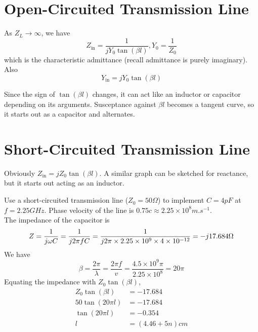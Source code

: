 \documentclass[12pt]{article}
\begin{document}
\section{Open-Circuited Transmission Line}

As $Z_L \rightarrow \infty$, we have
$$Z_{\text{in}} = \frac{1}{jY_0\tan(\beta l)}, Y_0 = \frac{1}{Z_0}$$
which is the characteristic admittance (recall admittance is purely imaginary). Also
$$Y_{\text{in}} = jY_0\tan(\beta l)$$

Since the sign of $\tan(\beta l)$ changes, it can act like an inductor or capacitor depending on its arguments. Susceptance against $\beta l$ becomes a tangent curve, so it starts out as a capacitor and alternates.

\section{Short-Circuited Transmission Line}

Obviously $Z_{\text{in}} = jZ_0\tan(\beta l)$. A similar graph can be sketched for reactance, but it starts out acting as an inductor.

\begin{ex}
    Use a short-circuited transmission line ($Z_0 = 50\unit{\Omega}$) to implement $C = 4\unit{pF}$ at $f = 2.25\unit{GHz}$. Phase velocity of the line is $0.75c \approx 2.25 \times 10^8\unit{m.s^{-1}}$. \\
    The impedance of the capacitor is
    $$Z = \frac{1}{j\omega C} = \frac{1}{j2\pi fC} = \frac{1}{j2\pi\times2.25\times10^9\times4\times10^{-12}} = -j17.684\unit\Omega$$
    We have
    $$\beta = \frac{2\pi}{\lambda} = \frac{2\pi f}{v} = \frac{4.5\times10^9\pi}{2.25\times10^8} = 20\pi$$
    Equating the impedance with $Z_0\tan(\beta l)$,
    \begin{align*}
        Z_0\tan(\beta l) &= -17.684 \\
        50\tan(20\pi l) &= -17.684 \\
        \tan(20\pi l) &= -0.354 \\
        l &= (4.46 + 5n) \unit{cm}
    \end{align*}
\end{ex}
\end{document}

